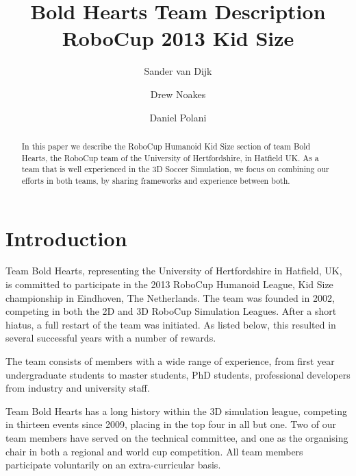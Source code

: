 \documentclass{llncs}
\title{Bold Hearts Team Description\\RoboCup 2013 Kid Size}
\author{Sander van Dijk \and Drew Noakes \and Daniel Polani}
\institute{Adaptive Systems Research Group\\School of Computer Science\\University of Hertfordshire, UK}
\begin{document}
\maketitle

%
%

\begin{abstract}
  In this paper we describe the RoboCup Humanoid Kid Size section of
  team Bold Hearts, the RoboCup team of the University of
  Hertfordshire, in Hatfield UK. As a team that is well experienced in
  the 3D Soccer Simulation, we focus on combining our efforts in both
  teams, by sharing frameworks and experience between both. 
\end{abstract}

\section{Introduction}
\label{sec:introduction}

Team Bold Hearts, representing the University of Hertfordshire in
Hatfield, UK, is committed to participate in the 2013 RoboCup Humanoid
League, Kid Size championship in Eindhoven, The Netherlands. The team
was founded in 2002, competing in both the 2D and 3D RoboCup Simulation
Leagues. After a short hiatus, a full restart of the team was initiated.
As listed below, this resulted in several successful years with a number
of rewards.

The team consists of members with a wide range of experience, from
first year undergraduate students to master students, PhD
students, professional developers from industry and university
staff.

Team Bold Hearts has a long history within the 3D simulation league, competing
in thirteen events since 2009, placing in the top four in all but one.
Two of our team members have served on the technical committee, and one as
the organising chair in both a regional and world cup competition.
All team members participate voluntarily on an extra-curricular basis.
\end{document}
